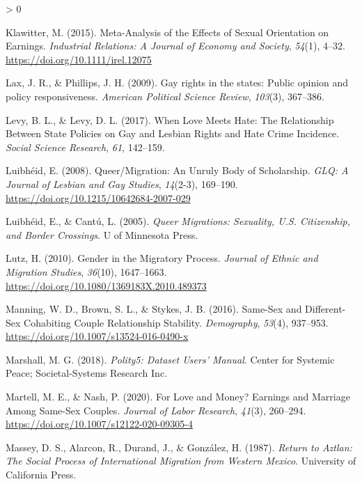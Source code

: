 \documentclass[
  11pt,
]{article}
\newlength{\cslhangindent}
\newenvironment{CSLReferences}[2] %
 {%
  \setlength{\parindent}{0pt}
  \ifodd #1 \everypar{\setlength{\hangindent}{\cslhangindent}}\ignorespaces\fi
  \ifnum #2 > 0
  \setlength{\parskip}{#2\baselineskip}
  \fi
 }%
 {}
\begin{document}
\begin{CSLReferences}{1}{0}
\leavevmode\hypertarget{ref-klawitter_2015}{}%
Klawitter, M. (2015). Meta-{Analysis} of the {Effects} of {Sexual} {Orientation} on {Earnings}. \emph{Industrial Relations: A Journal of Economy and Society}, \emph{54}(1), 4--32. \url{https://doi.org/10.1111/irel.12075}

\leavevmode\hypertarget{ref-lax_2009}{}%
Lax, J. R., \& Phillips, J. H. (2009). Gay rights in the states: {Public} opinion and policy responsiveness. \emph{American Political Science Review}, \emph{103}(3), 367--386.

\leavevmode\hypertarget{ref-levy_2017}{}%
Levy, B. L., \& Levy, D. L. (2017). When {Love} {Meets} {Hate}: {The} {Relationship} {Between} {State} {Policies} on {Gay} and {Lesbian} {Rights} and {Hate} {Crime} {Incidence}. \emph{Social Science Research}, \emph{61}, 142--159.

\leavevmode\hypertarget{ref-luibheid_2008}{}%
Luibhéid, E. (2008). Queer/{Migration}: {An} {Unruly} {Body} of {Scholarship}. \emph{GLQ: A Journal of Lesbian and Gay Studies}, \emph{14}(2-3), 169--190. \url{https://doi.org/10.1215/10642684-2007-029}

\leavevmode\hypertarget{ref-luibheid_2005}{}%
Luibhéid, E., \& Cantú, L. (2005). \emph{Queer {Migrations}: {Sexuality}, {U}.{S}. {Citizenship}, and {Border} {Crossings}}. U of Minnesota Press.

\leavevmode\hypertarget{ref-lutz_2010}{}%
Lutz, H. (2010). Gender in the {Migratory} {Process}. \emph{Journal of Ethnic and Migration Studies}, \emph{36}(10), 1647--1663. \url{https://doi.org/10.1080/1369183X.2010.489373}

\leavevmode\hypertarget{ref-manning_2016}{}%
Manning, W. D., Brown, S. L., \& Stykes, J. B. (2016). Same-{Sex} and {Different}-{Sex} {Cohabiting} {Couple} {Relationship} {Stability}. \emph{Demography}, \emph{53}(4), 937--953. \url{https://doi.org/10.1007/s13524-016-0490-x}

\leavevmode\hypertarget{ref-marshall_2018}{}%
Marshall, M. G. (2018). \emph{Polity5: {Dataset} {Users}' {Manual}}. Center for Systemic Peace; Societal-Systems Research Inc.

\leavevmode\hypertarget{ref-martell_2020}{}%
Martell, M. E., \& Nash, P. (2020). For {Love} and {Money}? {Earnings} and {Marriage} {Among} {Same}-{Sex} {Couples}. \emph{Journal of Labor Research}, \emph{41}(3), 260--294. \url{https://doi.org/10.1007/s12122-020-09305-4}

\leavevmode\hypertarget{ref-massey_1987}{}%
Massey, D. S., Alarcon, R., Durand, J., \& González, H. (1987). \emph{Return to {Aztlan}: {The} {Social} {Process} of {International} {Migration} from {Western} {Mexico}}. University of California Press.


\end{CSLReferences}
\end{document}
